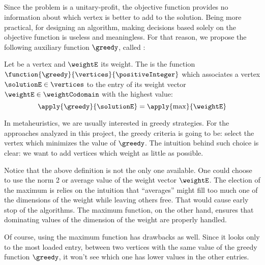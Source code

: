 \subsection{\greedyCriteriaText}
\label{subsection:greedy-criteria}

Since the problem is a unitary-profit, the objective function provides no information about which vertex is better to add to the solution. Being more practical, for designing an algorithm, making decisions based solely on the objective function is useless and meaningless. For that reason, we propose the following auxiliary function $\greedy$, called \greedyCriteriaText:

\begin{defn}[\greedyCriteriaText]
    \label{def:greedy-criteria}
    Let  be a vertex and $\weightE$ its weight. The \greedyCriteriaText is the function $\function{\greedy}{\vertices}{\positiveInteger}$ which associates a vertex $\solutionE \in \vertices$ to the entry of its weight vector $\weightE \in \weightCodomain$ with the highest value:
    \begin{equation}
        \label{eq:greedy-criteria}
        \apply{\greedy}{\solutionE} = \apply{\max}{\weightE}
    \end{equation}
\end{defn}

In metaheuristics, we are usually interested in greedy strategies. For the approaches analyzed in this project, the greedy criteria is going to be: select the vertex which minimizes the value of $\greedy$. The intuition behind such choice is clear: we want to add vertices which weight as little as possible.

Notice that the above definition is not the only one available. One could choose to use the norm 2 or average value of the weight vector $\weightE$. The election of the maximum is relies on the intuition that ``averages'' might fill too much one of the dimensions of the weight while leaving others free. That would cause early stop of the algorithms. The maximum function, on the other hand, ensures that dominating values of the dimension of the weight are properly handled.

Of course, using the maximum function has drawbacks as well. Since it looks only to the most loaded entry, between two vertices with the same value of the greedy function $\greedy$, it won't see which one has lower values in the other entries.
